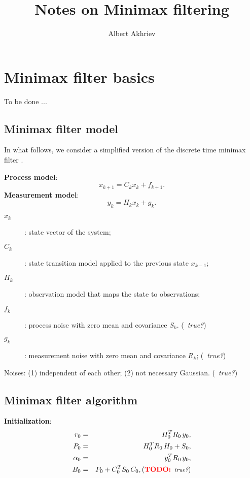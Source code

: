\documentclass[]{article}
\title{Notes on Minimax filtering}
\author{Albert Akhriev}
\newcommand{\TODO}[1]{({\bf{\color{red}{TODO:}}}\,\,\,{\footnotesize\it{#1}})}
\begin{document}
\maketitle


\section{Minimax filter basics}

To be done ...


\subsection{Minimax filter model}

In what follows, we consider a simplified version of the discrete time minimax filter \cite{Zhuk09}.

\noindent\textbf{Process model}:
\begin{equation}
x_{k+1} = C_k x_k + f_{k+1}.
\end{equation}
\noindent\textbf{Measurement model}:
\begin{equation}
y_k = H_k x_k + g_k.
\end{equation}
\begin{description}
\item[$x_k$]: state vector of the system;
\item[$C_k$]: state transition model applied to the previous state $x_{k-1}$;
\item[$H_k$]: observation model that maps the state to observations;
\item[$f_k$]: process noise with zero mean and covariance $S_k$. \TODO{true?}
\item[$g_k$]: measurement noise with zero mean and covariance $R_k$; \TODO{true?}
\end{description}

\noindent Noises: (1) independent of each other; (2) not necessary Gaussian. \TODO{true?}

\subsection{Minimax filter algorithm}

\noindent\textbf{Initialization}:
\begin{eqnarray}
r_0      &=& H_0^T R_0 \, y_0, \\
P_0      &=& H_0^T R_0 \, H_0 + S_0, \\
\alpha_0 &=& y_0^T R_0 \, y_0, \\
B_0      &=& P_0 + C_0^T S_0 \, C_0,  \mbox{\TODO{true?}}
\end{eqnarray}
\end{document}
